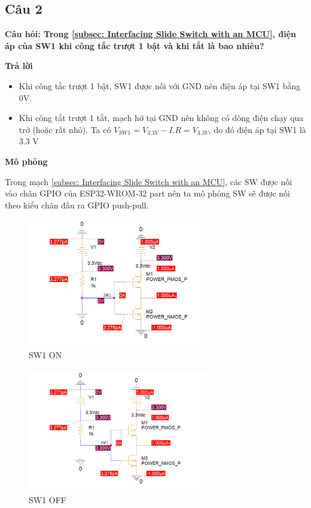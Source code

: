 \subsection{Câu 2}
\textbf{Câu hỏi: Trong \ref{subsec: Interfacing Slide Switch with an MCU}, điện áp của SW1 khi công tắc trượt 1 bật và khi tắt là bao nhiêu?}

\textbf{Trả lời}
\begin{itemize}
    \item Khi công tắc trượt 1 bật, SW1 được nối với GND nên điện áp tại SW1 bằng 0V.
    \item Khi công tắt trượt 1 tắt, mạch hở tại GND nên không có dòng điện chạy qua trở (hoặc rất nhỏ). Ta có $V_{SW1} = V_{3.3V} - I.R = V_{3.3V}$, do đó điện áp tại SW1 là 3.3 V 
\end{itemize}

\textbf{Mô phỏng}

Trong mạch \ref{subsec: Interfacing Slide Switch with an MCU}, các SW được nối vào chân GPIO của ESP32-WROM-32 part nên ta mô phỏng SW sẽ được nối theo kiểu chân đầu ra GPIO push-pull.

\begin{figure}[ht]
    \centering
    \includegraphics[width=0.7\textwidth]{graphics/section5/f1.png}
    \caption{SW1 ON}
\end{figure}

\begin{figure}[ht]
    \centering
    \includegraphics[width=0.7\textwidth]{graphics/section5/f2.png}
    \caption{SW1 OFF}
\end{figure}

